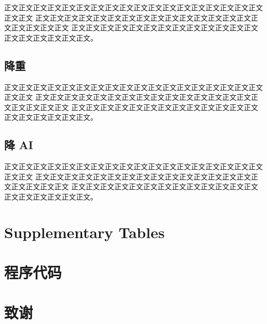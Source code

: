 \documentclass{hbutthesis}
\begin{document}
正文正文正文正文正文正文正文正文正文正文正文正文正文正文正文正文正文正文正文正文
正文正文正文正文正文正文正文正文正文正文正文正文正文正文正文正文正文正文正文正文
正文正文正文正文正文正文正文正文正文正文正文正文正文正文正文正文正文正文正文。

\section{降重}

正文正文正文正文正文正文正文正文正文正文正文正文正文正文正文正文正文正文正文正文
正文正文正文正文正文正文正文正文正文正文正文正文正文正文正文正文正文正文正文正文
正文正文正文正文正文正文正文正文正文正文正文正文正文正文正文正文正文正文正文。

\section{降 AI}

正文正文正文正文正文正文正文正文正文正文正文正文正文正文正文正文正文正文正文正文
正文正文正文正文正文正文正文正文正文正文正文正文正文正文正文正文正文正文正文正文
正文正文正文正文正文正文正文正文正文正文正文正文正文正文正文正文正文正文正文。

\newpage
{}
\printbibliography[heading=bibintoc,title={参考文献}] %

\clearpage
\makehbuappendix

\chapter{Supplementary Tables}


\newpage
\chapter{程序代码}


\newpage
\thispagestyle{thanks}
\chapter*{致\hspace{1em}谢}


\end{document}
